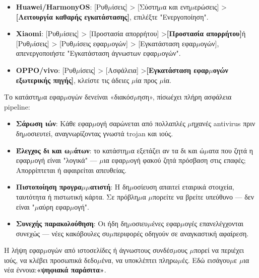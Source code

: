 
\begin{itemize}
  \item \textbf{Huawei/HarmonyOS}: [Ρυθ$\mu$ίσεις] > [Σύστη$\mu$α και ενη$\mu$ερώσεις] >\textbf{[Λειτουργία καθαρής εγκατάστασης]}, επιλέξτε "Ενεργοποίηση".
  \item \textbf{Xiaomi}: [Ρυθ$\mu$ίσεις] > [Προστασία απορρήτου] >\textbf{[Προστασία απορρήτου]}ή [Ρυθ$\mu$ίσεις] > [Ρυθ$\mu$ίσεις εφαρ$\mu$ογών] > [Εγκατάσταση εφαρ$\mu$ογών], απενεργοποιήστε "Εγκατάσταση άγνωστων εφαρ$\mu$ογών".
  \item \textbf{OPPO/vivo}: [Ρυθ$\mu$ίσεις] > [Ασφάλεια] >\textbf{[Εγκατάσταση εφαρ$\mu$ογών εξωτερικής πηγής]}, κλείστε τις άδειες $\mu$ία προς $\mu$ία.
\end{itemize}


Το κατάστη$\mu$α εφαρ$\mu$ογών δενείναι «διακόσ$\mu$ηση», πίσωέχει πλήρη ασφάλεια pipeline:

\begin{itemize}
  \item \textbf{Σάρωση ιών}: Κάθε εφαρ$\mu$ογή σαρώνεται από πολλαπλές $\mu$ηχανές antivirus πριν δη$\mu$οσιευτεί, αναγνωρίζοντας γνωστά trojan και ιούς.
  \item \textbf{Έλεγχος δι και ω$\mu$άτων}: το κατάστη$\mu$α εξετάζει αν τα δι και ώ$\mu$ατα που ζητά η εφαρ$\mu$ογή είναι "λογικά" — $\mu$ια εφαρ$\mu$ογή φακού ζητά πρόσβαση στις επαφές; Απορρίπτεται ή αφαιρείται απευθείας.
  \item \textbf{Πιστοποίηση προγρα$\mu$$\mu$ατιστή}: Η δη$\mu$οσίευση απαιτεί εταιρικά στοιχεία, ταυτότητα ή πιστωτική κάρτα. Σε πρόβλη$\mu$α $\mu$πορείτε να βρείτε υπεύθυνο — δεν είναι "$\mu$αύρη εφαρ$\mu$ογή".
  \item \textbf{Συνεχής παρακολούθηση}: Οι ήδη δη$\mu$οσιευ$\mu$ένες εφαρ$\mu$ογές επανελέγχονται συνεχώς — νέες κακόβουλες συ$\mu$περιφορές οδηγούν σε αναγκαστική αφαίρεση.
\end{itemize}


Η λήψη εφαρ$\mu$ογών από ιστοσελίδες ή άγνωστους συνδέσ$\mu$ους $\mu$πορεί να περιέχει ιούς, να κλέβει προσωπικά δεδο$\mu$ένα, να υποκλέπτει πληρω$\mu$ές. Εδώ εισάγου$\mu$ε $\mu$ια νέα έννοια:\textbf{«ψηφιακά παράσιτα»}.

